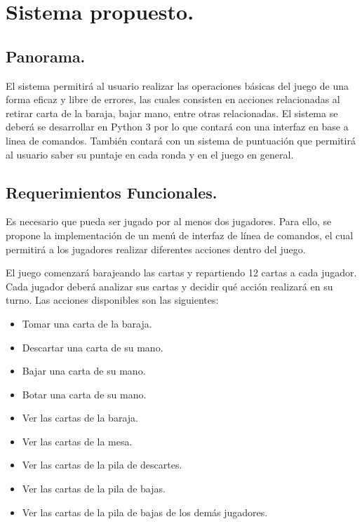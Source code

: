 \pagebreak

\section{Sistema propuesto.}\label{cap:sistema}
\subsection{Panorama.}\label{cap:panorama}

El sistema permitirá al usuario realizar las operaciones básicas del juego de una forma eficaz y libre de errores, 
las cuales consisten en acciones relacionadas al retirar carta de la baraja, bajar mano, entre otras relacionadas. 
El sistema se deberá se desarrollar en Python 3 por lo que contará con una interfaz en base a linea de comandos.
También contará con un sistema de puntuación que permitirá al usuario saber su puntaje en cada ronda y en el juego en general.

\subsection{Requerimientos Funcionales.}\label{cap:requerimientos-funcionales}

Es necesario que pueda ser jugado por al menos dos jugadores. Para ello, se propone la implementación de un menú de interfaz de línea de comandos, el cual permitirá a los jugadores realizar diferentes acciones dentro del juego.

El juego comenzará barajeando las cartas y repartiendo 12 cartas a cada jugador. Cada jugador deberá analizar sus cartas y decidir qué acción realizará en su turno. Las acciones disponibles son las siguientes:
\begin{itemize}
  \item Tomar una carta de la baraja.
  \item Descartar una carta de su mano.
  \item Bajar una carta de su mano.
  \item Botar una carta de su mano.
  \item Ver las cartas de la baraja.
  \item Ver las cartas de la mesa.
  \item Ver las cartas de la pila de descartes.
  \item Ver las cartas de la pila de bajas.
  \item Ver las cartas de la pila de bajas de los demás jugadores.
\end{itemize}

